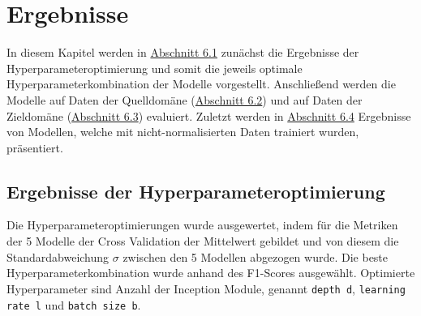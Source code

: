 \chapter{Ergebnisse}\label{chap:Ergebnisse}

In diesem Kapitel werden in \hyperref[sec:Hyperparameter]{Abschnitt 6.1} zunächst die Ergebnisse der Hyperparameteroptimierung und somit die jeweils optimale Hyperparameterkombination der Modelle vorgestellt. Anschließend werden die Modelle auf Daten der Quelldomäne (\hyperref[sec:quelldomäne]{Abschnitt 6.2}) und auf Daten der Zieldomäne (\hyperref[sec:zieldomäne]{Abschnitt 6.3}) evaluiert. Zuletzt werden in \hyperref[sec:nichtnormalisiert]{Abschnitt 6.4} Ergebnisse von Modellen, welche mit nicht-normalisierten Daten trainiert wurden, präsentiert.


\section{Ergebnisse der Hyperparameteroptimierung}\label{sec:Hyperparameter}

Die Hyperparameteroptimierungen wurde ausgewertet, indem für die Metriken der 5 Modelle der Cross Validation der Mittelwert gebildet und von diesem die Standardabweichung $\sigma$ zwischen den 5 Modellen abgezogen wurde. Die beste Hyperparameterkombination wurde anhand des F1-Scores ausgewählt.  Optimierte Hyperparameter sind Anzahl der Inception Module, genannt \texttt{depth d}, \texttt{learning rate l} und \texttt{batch size b}.

